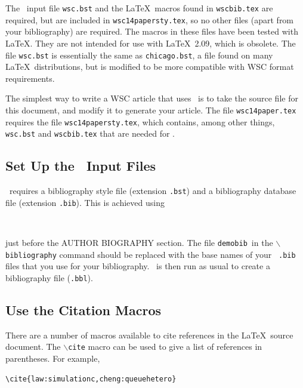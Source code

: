 \documentclass{wscpaperproc}
\theoremstyle{wsc}
\begin{document}
The \BibTeX\ input file {\tt wsc.bst} and the \LaTeX\ macros found in {\tt wscbib.tex} are required, but are included in {\tt wsc14papersty.tex}, so no other files (apart from your bibliography) are required.
The macros in these files have been tested with \LaTeX. They are not intended for use with \LaTeX\ 2.09, which is obsolete.
The file {\tt wsc.bst} is essentially the same as {\tt chicago.bst}, a file found on many \LaTeX\ distributions, but is
modified to be more compatible with WSC format requirements.

The simplest way to write a WSC article that uses \BibTeX\ is to take the source file for this document, and modify it to generate your article. The file {\tt wsc14paper.tex} requires the file {\tt wsc14papersty.tex}, which contains, among other things, {\tt wsc.bst} and {\tt wscbib.tex} that are needed for \BibTeX.

\subsection{Set Up the \BibTeX\ Input Files}

\BibTeX\ requires a bibliography style file (extension \texttt{.bst}) and a bibliography database file (extension \texttt{.bib}).  This is achieved
using\newline


\begin{verbatim}


\end{verbatim}\vspace{5mm}

\noindent just before the AUTHOR BIOGRAPHY section.  The file {\tt demobib}\ in the {\tt $\backslash$bibliography} command should be replaced with the base names of your \BibTeX\ {\tt *.bib} files that you use for your bibliography.  \BibTeX\ is then run as usual to create a bibliography file ({\tt *.bbl}).

\subsection{Use the Citation Macros}
There are a number of macros available to cite references in the \LaTeX\ source document.  The {\tt $\backslash$cite} macro can be used to give a list of references in parentheses.  For example,\newline

\begin{verbatim}
\cite{law:simulationc,cheng:queuehetero}
\end{verbatim}\vspace{5mm}
\end{document}
